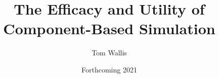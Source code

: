 \title{The Efficacy and Utility of Component-Based Simulation}
\author{Tom Wallis}
\date{Forthcoming 2021}





\usepackage{natbib}



\usepackage[obeyFinal]{todonotes}
\usepackage{hyperref}
\usepackage{cleveref}




